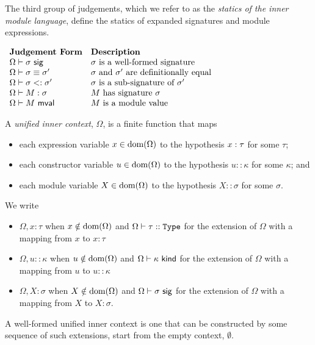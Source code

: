 The third group of judgements, which we refer to as the \emph{statics of the inner module language}, define the statics of expanded signatures and module expressions.

\vspace{10px}
$\begin{array}{ll}
\textbf{Judgement Form} & \textbf{Description}\\
\Omega \vdash \sigma~\mathsf{sig} & \text{$\sigma$ is a well-formed signature }\\
\Omega \vdash \sigma \equiv \sigma' & \text{$\sigma$ and $\sigma'$ are definitionally equal}\\
\Omega \vdash \sigma <: \sigma' & \text{$\sigma$ is a sub-signature of $\sigma'$}\\
\Omega \vdash M : \sigma & \text{$M$ has signature $\sigma$}\\
\Omega \vdash M~\mathsf{mval} & \text{$M$ is a module value}
\end{array}$
\vspace{10px}

A \emph{unified inner context}, $\Omega$, is a finite function that maps
\begin{itemize}
\item each expression variable $x \in \text{dom}(\Omega)$ to the hypothesis $x : \tau$ for some $\tau$;
\item each constructor variable $u \in \text{dom}(\Omega)$ to the hypothesis $u :: \kappa$ for some $\kappa$; and
\item each module variable $X \in \text{dom}(\Omega)$ to the hypothesis $X :: \sigma$ for some $\sigma$.
\end{itemize}
We write
\begin{itemize}
\item $\Omega, x : \tau$ when $x \notin \text{dom}(\Omega)$ and $\Omega \vdash \tau :: \texttt{Type}$ for the extension of $\Omega$ with a mapping from $x$ to $x : \tau$
\item $\Omega, u :: \kappa$ when $u \notin \text{dom}(\Omega)$ and $\Omega \vdash \kappa~\mathsf{kind}$ for the extension of $\Omega$ with a mapping from $u$ to $u :: \kappa$
\item $\Omega, X : \sigma$ when $X \notin \text{dom}(\Omega)$ and $\Omega \vdash \sigma~\mathsf{sig}$ for the extension of $\Omega$ with a mapping from $X$ to $X : \sigma$.
\end{itemize}
A well-formed unified inner context is one that can be constructed by some sequence of such extensions, start from the empty context, $\emptyset$.


